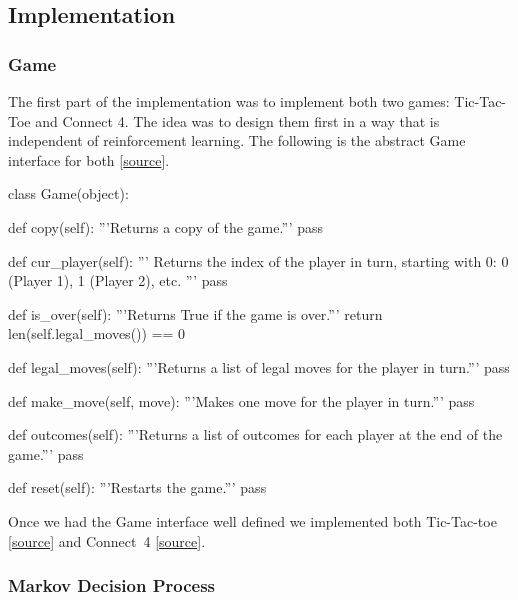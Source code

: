 \documentclass{article}
\newcommand{\GithubURL}[1]{[\href{https://github.com/davidrobles/mlnd-capstone-code/blob/master/#1}{source}]}
\begin{document}
\subsection{Implementation}

\subsubsection{Game}

The first part of the implementation was to implement both two games: Tic-Tac-Toe and Connect 4. The
idea was to design them first in a way that is independent of reinforcement learning. The following
is the abstract Game interface for both \GithubURL{capstone/game/game.py}.

\begin{python}
class Game(object):

    def copy(self):
        '''Returns a copy of the game.'''
        pass

    def cur_player(self):
        '''
        Returns the index of the player in turn, starting with 0:
        0 (Player 1), 1 (Player 2), etc.
        '''
        pass

    def is_over(self):
        '''Returns True if the game is over.'''
        return len(self.legal_moves()) == 0

    def legal_moves(self):
        '''Returns a list of legal moves for the player in turn.'''
        pass

    def make_move(self, move):
        '''Makes one move for the player in turn.'''
        pass

    def outcomes(self):
        '''Returns a list of outcomes for each player at the end of the game.'''
        pass

    def reset(self):
        '''Restarts the game.'''
        pass
\end{python}

Once we had the Game interface well defined we implemented both Tic-Tac-toe
\GithubURL{capstone/game/games/tictactoe.py} and \mbox{Connect 4}
\GithubURL{capstone/game/games/connect4.py}.

\subsubsection{Markov Decision Process}
\end{document}
